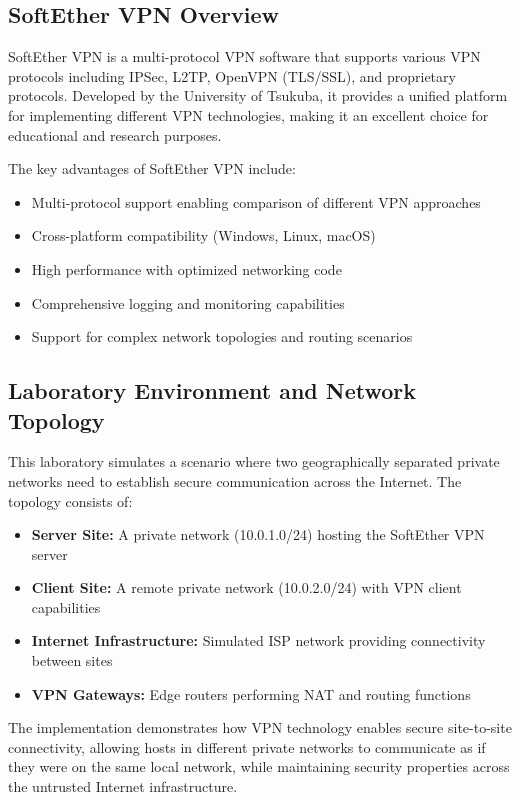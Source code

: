 \subsection{SoftEther VPN Overview}

SoftEther VPN is a multi-protocol VPN software that supports various VPN protocols including IPSec, L2TP, OpenVPN (TLS/SSL), and proprietary protocols. Developed by the University of Tsukuba, it provides a unified platform for implementing different VPN technologies, making it an excellent choice for educational and research purposes.

The key advantages of SoftEther VPN include:
\begin{itemize}
    \item Multi-protocol support enabling comparison of different VPN approaches
    \item Cross-platform compatibility (Windows, Linux, macOS)
    \item High performance with optimized networking code
    \item Comprehensive logging and monitoring capabilities
    \item Support for complex network topologies and routing scenarios
\end{itemize}

\subsection{Laboratory Environment and Network Topology}

This laboratory simulates a scenario where two geographically separated private networks need to establish secure communication across the Internet. The topology consists of:

\begin{itemize}
    \item \textbf{Server Site:} A private network (10.0.1.0/24) hosting the SoftEther VPN server
    \item \textbf{Client Site:} A remote private network (10.0.2.0/24) with VPN client capabilities
    \item \textbf{Internet Infrastructure:} Simulated ISP network providing connectivity between sites
    \item \textbf{VPN Gateways:} Edge routers performing NAT and routing functions
\end{itemize}

The implementation demonstrates how VPN technology enables secure site-to-site connectivity, allowing hosts in different private networks to communicate as if they were on the same local network, while maintaining security properties across the untrusted Internet infrastructure.

